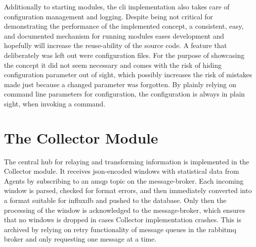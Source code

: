 Additionally to starting modules, the \gls{cli} implementation also takes care of configuration management and logging.
Despite being not critical for demonstrating the performance of the implemented concept, a consistent, easy, and documented mechanism for running modules eases development and hopefully will increase the reuse-ability of the source code.
A feature that deliberately was left out were configuration files. For the purpose of showcasing the concept it did not seem necessary and comes with the risk of hiding configuration parameter out of sight, which possibly increases the risk of mistakes made just because a changed parameter was forgotten. By plainly relying on command line parameters for configuration, the configuration is always in plain sight, when invoking a command.


\section{The Collector Module}
\label{sec:impl:collector}

\begin{comment}
\begin{itemize}
	\item central hub for relaying information
	\item receives agent windows via \gls{amqp} message broker (cf. Figure~\ref{fig:concept:architecture})
	\item subscribed to the agent topic using \gls{lib-pika} version 0.11
	\item incoming windows from agents are stored immediately in \gls{influxdb}
	\item every 4 seconds a callback \hint{(other word for callback?)} is called
	\item callback queries \gls{influxdb} for not relayed windows
		\subitem ordered latest first
		\subitem so a cumulating backlog does not affect the ability to show/process near-real-time metrics
		\subitem old windows will be processed once backlog decreases
	\item collector groups windows by timeslot
		\subitem so analysers receive a snapshot of the network
		\subitem allows them to analyse world-view without the need to compensate time-difference
\end{itemize}
\end{comment}

The central hub for relaying and transforming information is implemented in the Collector module.
It receives \gls{json}-encoded windows with statistical data from Agents by subscribing to an \gls{amqp} topic on the message-broker. Each incoming window is parsed, checked for format errors, and then immediately converted into a format suitable for \gls{influxdb} and pushed to the database. Only then the processing of the window is acknowledged to the message-broker, which ensures that no windows is dropped in cases Collector implementation crashes. This is archived by relying on retry functionality of message queues in the \gls{rabbitmq} broker and only requesting one message at a time.


